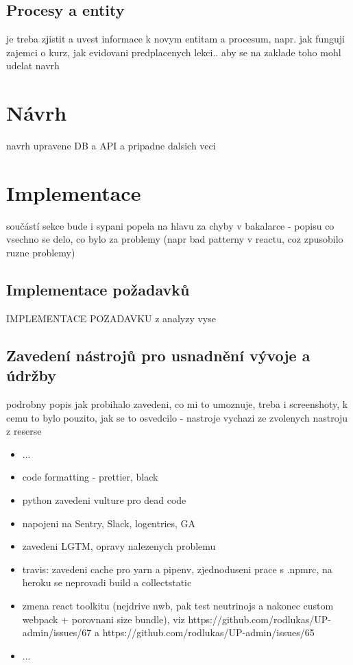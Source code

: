 \section{Procesy a entity}
je treba zjistit a uvest informace k novym entitam a procesum, napr. jak funguji zajemci o kurz, jak evidovani predplacenych lekci.. aby se na zaklade toho mohl udelat navrh


\chapter{Návrh}
navrh upravene DB a API a pripadne dalsich veci

\chapter{Implementace}
součástí sekce bude i sypani popela na hlavu za chyby v bakalarce - popisu co vsechno se delo, co bylo za problemy (napr bad patterny v reactu, coz zpusobilo ruzne problemy)

\section{Implementace požadavků}
IMPLEMENTACE POZADAVKU z analyzy vyse

\section{Zavedení nástrojů pro usnadnění vývoje a údržby}
podrobny popis jak probihalo zavedeni, co mi to umoznuje, treba i screenshoty, k cemu to bylo pouzito, jak se to osvedcilo - nastroje vychazi ze zvolenych nastroju z reserse
 
\begin{itemize}
\item ...
\item code formatting - prettier, black
\item python zavedeni vulture pro dead code
\item napojeni na Sentry, Slack, logentries, GA
\item zavedeni LGTM, opravy nalezenych problemu
\item travis: zavedeni cache pro yarn a pipenv, zjednoduseni prace s .npmrc, na heroku se neprovadi build a collectstatic
\item zmena react toolkitu (nejdrive nwb, pak test neutrinojs a nakonec custom webpack + porovnani size bundle), viz https://github.com/rodlukas/UP-admin/issues/67 a https://github.com/rodlukas/UP-admin/issues/65
\item ...
\end{itemize}


